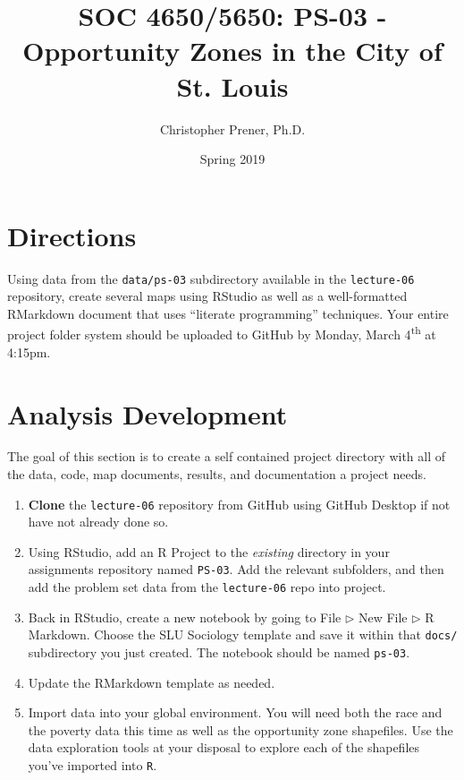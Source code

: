 \documentclass{tufte-handout}
\title{SOC 4650/5650: PS-03 - Opportunity Zones in the City of St. Louis}
\author{Christopher Prener, Ph.D.}
\date{Spring 2019}
\begin{document}
\maketitle %

\vspace{5mm}
\section{Directions}
Using data from the \texttt{data/ps-03} subdirectory available in the \texttt{lecture-06} repository, create several maps using RStudio as well as a well-formatted RMarkdown document that uses ``literate programming'' techniques. Your entire project folder system should be uploaded to GitHub by Monday, March 4\textsuperscript{th} at 4:15pm.

\vspace{5mm}
\section{Analysis Development}
The goal of this section is to create a self contained project directory with all of the data, code, map documents, results, and documentation a project needs.
\begin{enumerate}[label=\alph*.]
\item \textbf{Clone} the \texttt{lecture-06} repository from GitHub using GitHub Desktop if not have not already done so.
\item Using RStudio, add an R Project to the \textit{existing} directory in your assignments repository named \texttt{PS-03}. Add the relevant subfolders, and then add the problem set data from the \texttt{lecture-06} repo into project.
\item Back in RStudio, create a new notebook by going to \textsf{File $\triangleright$ New File $\triangleright$} {\color{red}\textsf{R Markdown}}. Choose the SLU Sociology template and save it within that \texttt{docs/} subdirectory you just created. The notebook should be named \texttt{ps-03}.
\item Update the RMarkdown template as needed.
\item Import data into your global environment. You will need both the race and the poverty data this time as well as the opportunity zone shapefiles. Use the data exploration tools at your disposal to explore each of the shapefiles you've imported into \texttt{R}.
\end{enumerate}
\end{document}
